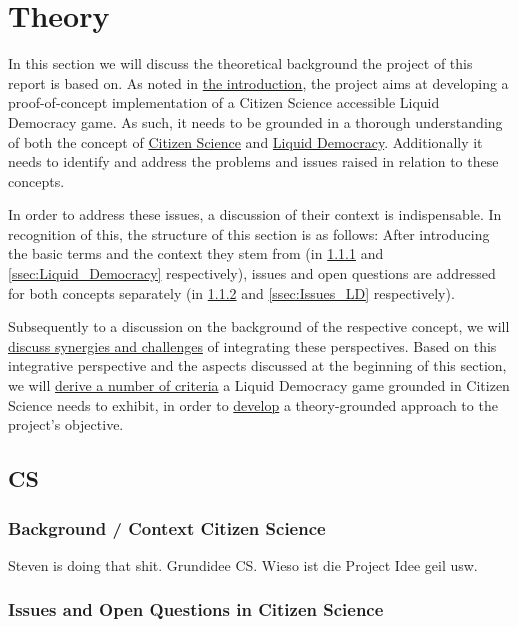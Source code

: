 \chapter{Theory}
\label{ch:Theory}

In this section we will discuss the theoretical background the project of this report is based on. As noted in \href{ssec:Objective}{the introduction}, the project aims at developing a proof-of-concept implementation of a Citizen Science accessible Liquid Democracy game. As such, it needs to be grounded in a thorough understanding of both the concept of \href{ssec:Theory_CS}{Citizen Science} and \href{ssec:Theory_LD}{Liquid Democracy}. Additionally it needs to identify and address the problems and issues raised in relation to these concepts. 

In order to address these issues, a discussion of their context is indispensable. In recognition of this, the structure of this section is as follows:
After introducing the basic terms and the context they stem from (in \ref{ssec:Background_CS} and \ref{ssec:Liquid_Democracy} respectively), issues and open questions are addressed for both concepts separately (in \ref{ssec:Issues_CS} and \ref{ssec:Issues_LD} respectively). 

Subsequently to a discussion on the background of the respective concept, we will \href{ssec:Integration_CSLD}{discuss synergies and challenges} of integrating these perspectives. Based on this integrative perspective and the aspects discussed at the beginning of this section, we will \href{ssec:Criteria}{derive a number of criteria} a Liquid Democracy game grounded in Citizen Science needs to exhibit, in order to \href{sec:Approach}{develop} a theory-grounded approach to the project's objective.
\section{CS}
\label{sec:Theory_CS}
\subsection{Background / Context Citizen Science}
\label{ssec:Background_CS}
Steven is doing that shit. Grundidee CS. Wieso ist die Project Idee geil usw.
\subsection{Issues and Open Questions in Citizen Science}
\label{ssec:Issues_CS}

\newpage

